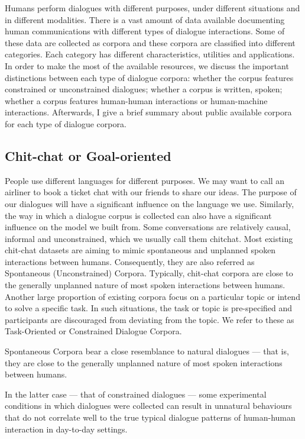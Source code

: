 \documentclass[bsc,frontabs,twoside,singlespacing,parskip,deptreport]{infthesis}     %
\begin{document}
Humans perform dialogues with different purposes, under different situations and in different modalities. There is a vast amount of data available documenting human communications with different types of dialogue interactions. Some of these data are collected as corpora and these corpora are classified into different categories. Each category has different characteristics, utilities and applications. In order to make the most of the available resources, we discuss the important distinctions between each type of dialogue corpora: whether the corpus features constrained or unconstrained dialogues; whether a corpus is written, spoken; whether a corpus features human-human interactions or human-machine interactions. Afterwards, I give a brief summary about public available corpora for each type of dialogue corpora.


\subsection{Chit-chat or Goal-oriented}

People use different languages for different purposes. We may want to call an airliner to book a ticket chat with our friends to share our ideas. The purpose of our dialogues will have a significant influence on the language we use. Similarly, the way in which a dialogue corpus is collected can also have a significant influence on the model we built from. Some conversations are relatively causal, informal and unconstrained, which we usually call them chitchat. Most existing chit-chat datasets are aiming to mimic spontaneous and unplanned spoken interactions between humans. Consequently, they are also referred as Spontaneous (Unconstrained) Corpora. Typically, chit-chat corpora are close to the generally unplanned nature of most spoken interactions between humans. Another large proportion of existing corpora focus on a particular topic or intend to solve a specific task. In such situations, the task or topic is pre-specified and participants are discouraged from deviating from the topic. We refer to these as Task-Oriented or Constrained Dialogue Corpora.

Spontaneous Corpora bear a close resemblance to natural dialogues — that is, they are close to the generally unplanned nature of most spoken interactions between humans. 


In the latter case — that of constrained dialogues — some experimental conditions in which dialogues were collected can result in unnatural behaviours that do not correlate well to the true typical dialogue patterns of human-human interaction in day-to-day settings. 
\end{document}
